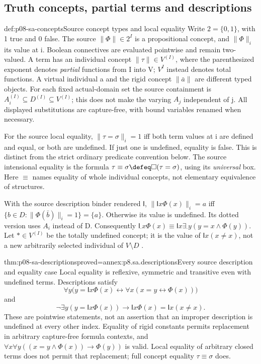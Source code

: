 \subsection{Truth concepts, partial terms and descriptions}

\begin{hbdefinition}{def:p08-sa-concepts}{Source concept types and local equality}
Write \(2=\{0,1\}\), with 1 true and 0 false. The source
\(\|\Phi\|\in2^I\) is a propositional concept, and
\(\|\Phi\|_i\) its value at i. Boolean connectives are evaluated
pointwise and remain two-valued. A term has an individual concept
\(\|\tau\|\in V^{(I)}\), where the parenthesized exponent denotes
\emph{partial} functions from I into V; \(V^I\) instead denotes
total functions. A virtual individual a and the rigid concept
\(\|\bar a\|\) are different typed objects.
For each fixed actual-domain set the source containment is
\(A_i^{(I)}\subseteq D^{(I)}\subseteq V^{(I)}\);
this does not make the varying \(A_j\) independent of j.
All displayed substitutions are capture-free, with bound variables
renamed when necessary.

For the source local equality, \(\|\tau=\sigma\|_i=1\) iff
both term values at i are defined and equal, or both are undefined.
If just one is undefined, equality is false. This is distinct from
the strict ordinary predicate convention below. The source intensional
equality is the formula
\(\tau\equiv\sigma\defeq\Box(\tau=\sigma)\), using its
\emph{universal} box. Here \(\equiv\) names equality of whole
individual concepts, not elementary equivalence of structures.

With the source description binder rendered \(\mathsf I\),
\(\|\mathsf I x\Phi(x)\|_i=a\) iff
\(\{b\in D:\|\Phi(\bar b)\|_i=1\}=\{a\}\).
Otherwise its value is undefined. Its dotted version uses \(A_i\)
instead of D. Consequently
\(\mathsf I_{\cdot}x\Phi(x)
\equiv\mathsf I x\exists_{\cdot}y(y=x\land\Phi(y))\).
Let \(\ast\in V^{(I)}\) be the totally undefined concept;
it is the value of \(\mathsf I x(x\ne x)\), not a new
arbitrarily selected individual of \(V\setminus D\)
\cite[\S III, pp.~152--155]{Scott1970}.
\end{hbdefinition}

\begin{hbtheorem}{thm:p08-sa-descriptions}{proved=annex:p8.sa.descriptions}{Every source description and equality case}
Local equality is reflexive, symmetric and transitive even with undefined
terms. Descriptions satisfy
\[
 \forall y\bigl(y=\mathsf I x\Phi(x)
       \leftrightarrow\forall x(x=y\leftrightarrow\Phi(x))\bigr)
\]
and
\[
 \neg\exists y(y=\mathsf I x\Phi(x))
       \to\mathsf I x\Phi(x)=\mathsf I x(x\ne x).
\]
These are pointwise statements, not an assertion that an improper
description is undefined at every other index. Equality of rigid constants
permits replacement in arbitrary capture-free formula contexts, and
\(\forall x\forall y((x=y\land\Phi(x))\to\Phi(y))\)
is valid. Local equality of arbitrary closed terms does not permit that
replacement; full concept equality \(\tau\equiv\sigma\) does.
\end{hbtheorem}


